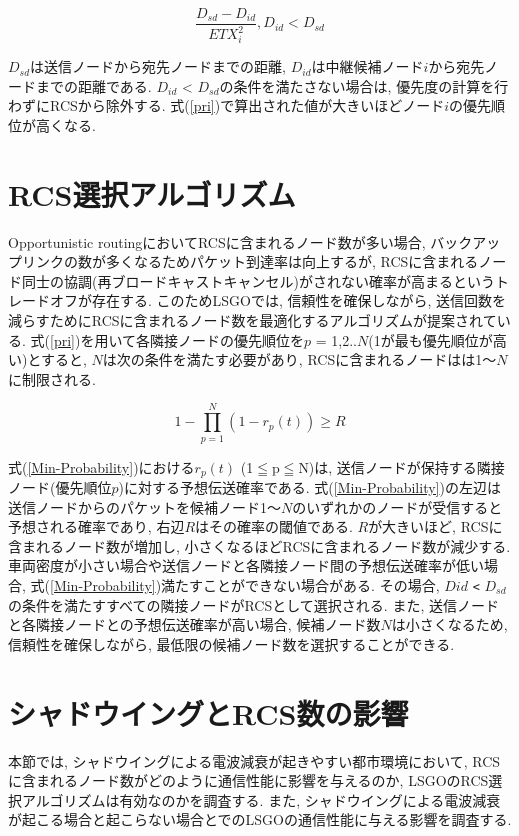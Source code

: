 \documentclass[10pt]{jreport}
\begin{document}
\begin{equation}
	\label{pri}
	\frac{D_{sd} - D_{id}}{ETX_{i}^{2}} ,   D_{id} < D_{sd}
\end{equation}

$D_{sd}$は送信ノードから宛先ノードまでの距離, $D_{id}$は中継候補ノード$i$から宛先ノードまでの距離である.  $D_{id}$ < $D_{sd}$の条件を満たさない場合は, 優先度の計算を行わずにRCSから除外する.
式(\ref{pri})で算出された値が大きいほどノード$i$の優先順位が高くなる. 

\section{RCS選択アルゴリズム}
Opportunistic routingにおいてRCSに含まれるノード数が多い場合, バックアップリンクの数が多くなるためパケット到達率は向上するが, RCSに含まれるノード同士の協調(再ブロードキャストキャンセル)がされない確率が高まるというトレードオフが存在する.  
このためLSGOでは, 信頼性を確保しながら, 送信回数を減らすためにRCSに含まれるノード数を最適化するアルゴリズムが提案されている.  
式(\ref{pri})を用いて各隣接ノードの優先順位を$p$ = 1,2..$N$(1が最も優先順位が高い)とすると, $N$は次の条件を満たす必要があり, RCSに含まれるノードはは1～$N$に制限される. 

\begin{equation}
	\label{Min-Probability}
	1 - \prod_{p=1}^N (1 - r_{p}(t))\geq R
\end{equation}

式(\ref{Min-Probability})における$r_{p}(t)$ (1$ \leqq $p$ \leqq $N)は, 送信ノードが保持する隣接ノード(優先順位$p$)に対する予想伝送確率である. 
式(\ref{Min-Probability})の左辺は送信ノードからのパケットを候補ノード1～$N$のいずれかのノードが受信すると予想される確率であり, 右辺$R$はその確率の閾値である. $R$が大きいほど, RCSに含まれるノード数が増加し, 小さくなるほどRCSに含まれるノード数が減少する. 車両密度が小さい場合や送信ノードと各隣接ノード間の予想伝送確率が低い場合, 式(\ref{Min-Probability})満たすことができない場合がある. その場合, $D{id}$ \verb|<| $D_{sd}$の条件を満たすすべての隣接ノードがRCSとして選択される. また, 送信ノードと各隣接ノードとの予想伝送確率が高い場合, 候補ノード数$N$は小さくなるため, 信頼性を確保しながら, 最低限の候補ノード数を選択することができる. 


\section{シャドウイングとRCS数の影響}
本節では, シャドウイングによる電波減衰が起きやすい都市環境において, RCSに含まれるノード数がどのように通信性能に影響を与えるのか, LSGOのRCS選択アルゴリズムは有効なのかを調査する.
また, シャドウイングによる電波減衰が起こる場合と起こらない場合とでのLSGOの通信性能に与える影響を調査する.
\end{document}
